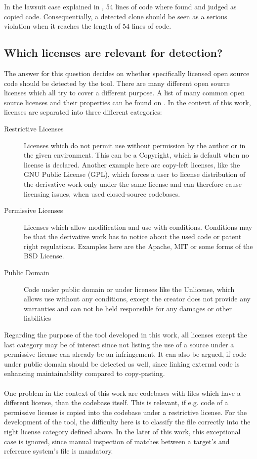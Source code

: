 In the lawsuit case explained in \cite{mertzel2008copying}, 54 lines of code where found and judged as copied code.
Consequentially, a detected clone should be seen as a serious violation when it reaches the length of 54 lines of code.

\subsection*{Which licenses are relevant for detection?}
The answer for this question decides on whether specifically licensed open source code should be detected by the tool.
There are many different open source licenses which all try to cover a different purpose.
A list of many common open source licenses and their properties can be found on \cite{licenses}.
In the context of this work, licenses are separated into three different categories:

\begin{description}
	\item[Restrictive Licenses] Licenses which do not permit use without permission by the author or in the given environment.
		This can be a Copyright, which is default when no license is declared.
		Another example here are copy-left licenses, like the GNU Public License (GPL), which forces a user to license distribution of the derivative work only under the same license and can therefore cause licensing issues, when used closed-source codebases.
	\item[Permissive Licenses]
		Licenses which allow modification and use with conditions.
		Conditions may be that the derivative work has to notice about the used code or patent right regulations.
		Examples here are the Apache, MIT or some forms of the BSD License.
	\item[Public Domain] 
		Code under public domain or under licenses like the Unlicense, which allows use without any conditions, except the creator does not provide any warranties and can not be held responsible for any damages or other liabilities
\end{description}

Regarding the purpose of the tool developed in this work, all licenses except the last category may be of interest since not listing the use of a source under a permissive license can already be an infringement.
It can also be argued, if code under public domain should be detected as well, since linking external code is enhancing maintainability compared to copy-pasting.%
\\ \\
\noindent
One problem in the context of this work are codebases with files which have a different license, than the codebase itself.
This is relevant, if e.g. code of a permissive license is copied into the codebase under a restrictive license.
For the development of the tool, the difficulty here is to classify the file correctly into the right license category defined above.
In the later of this work, this exceptional case is ignored, since manual inspection of matches between a target's and reference system's file is mandatory. %

